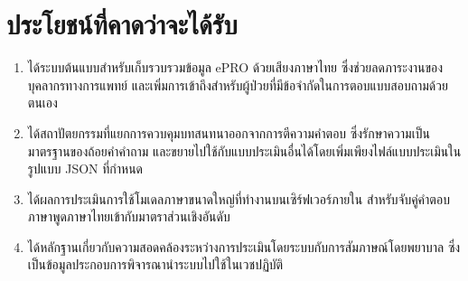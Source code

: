 \section{ประโยชน์ที่คาดว่าจะได้รับ}
\label{sec:benefits}

\begin{enumerate}
    \item ได้ระบบต้นแบบสำหรับเก็บรวบรวมข้อมูล ePRO ด้วยเสียงภาษาไทย ซึ่งช่วยลดภาระงานของบุคลากรทางการแพทย์ และเพิ่มการเข้าถึงสำหรับผู้ป่วยที่มีข้อจำกัดในการตอบแบบสอบถามด้วยตนเอง
    \item ได้สถาปัตยกรรมที่แยกการควบคุมบทสนทนาออกจากการตีความคำตอบ ซึ่งรักษาความเป็นมาตรฐานของถ้อยคำคำถาม และขยายไปใช้กับแบบประเมินอื่นได้โดยเพิ่มเพียงไฟล์แบบประเมินในรูปแบบ JSON ที่กำหนด
    \item ได้ผลการประเมินการใช้โมเดลภาษาขนาดใหญ่ที่ทำงานบนเซิร์ฟเวอร์ภายใน สำหรับจับคู่คำตอบภาษาพูดภาษาไทยเข้ากับมาตราส่วนเชิงอันดับ
    \item ได้หลักฐานเกี่ยวกับความสอดคล้องระหว่างการประเมินโดยระบบกับการสัมภาษณ์โดยพยาบาล ซึ่งเป็นข้อมูลประกอบการพิจารณานำระบบไปใช้ในเวชปฏิบัติ
\end{enumerate}

